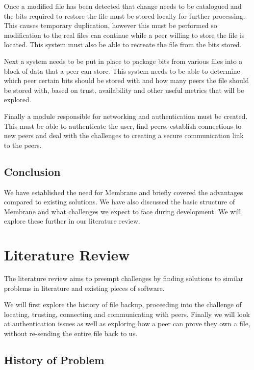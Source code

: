 \documentclass[11pt, a4paper, twocolumn, twoside]{report}
\begin{document}
Once a modified file has been detected that change needs to be catalogued and the bits required to restore the file must be stored locally for further processing. This causes temporary duplication, however this must be performed so modification to the real files can continue while a peer willing to store the file is located. This system must also be able to recreate the file from the bits stored.

Next a system needs to be put in place to package bits from various files into a block of data that a peer can store. This system needs to be able to determine which peer certain bits should be stored with and how many peers the file should be stored with, based on trust, availability and other useful metrics that will be explored.

Finally a module responsible for networking and authentication must be created. This must be able to authenticate the user, find peers, establish connections to new peers and deal with the challenges to creating a secure communication link to the peers.

\section{Conclusion}

We have established the need for Membrane and briefly covered the advantages compared to existing solutions. We have also discussed the basic structure of Membrane and what challenges we expect to face during development. We will explore these further in our literature review.

\chapter{Literature Review}

The literature review aims to preempt challenges by finding solutions to similar problems in literature and existing pieces of software.

We will first explore the history of file backup, proceeding into the challenge of locating, trusting, connecting and communicating with peers. Finally we will look at authentication issues as well as exploring how a peer can prove they own a file, without re-sending the entire file back to us.

\section{History of Problem}
\end{document}
